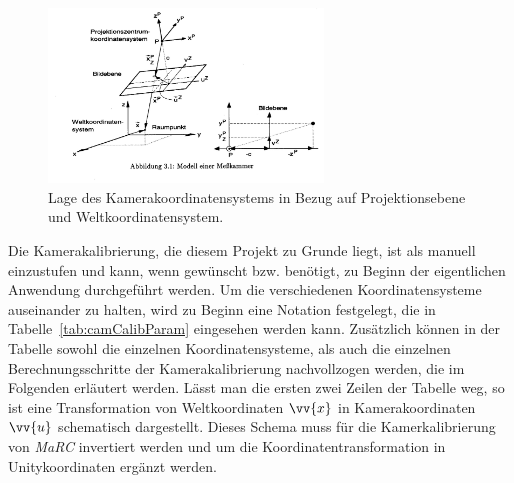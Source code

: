 \begin{figure}[H]
		\centering
		\includegraphics[width=0.65\textwidth , trim = 0mm 65mm 270mm 0mm, clip]{Bilder/cameraCalib.jpg}
			\caption{Lage des Kamerakoordinatensystems in Bezug auf Projektionsebene und Weltkoordinatensystem. \cite{Meisel:77890}}
			\label{fig:cameraCalib}
	\end{figure}

Die Kamerakalibrierung, die diesem Projekt zu Grunde liegt, ist als manuell einzustufen und kann, wenn gewünscht bzw. benötigt, zu Beginn der eigentlichen Anwendung durchgeführt werden. Um die verschiedenen Koordinatensysteme auseinander zu halten, wird zu Beginn eine Notation festgelegt, die in Tabelle~\ref{tab:camCalibParam} eingesehen werden kann. Zusätzlich können in der Tabelle sowohl die einzelnen Koordinatensysteme, als auch die einzelnen Berechnungsschritte der Kamerakalibrierung nachvollzogen werden, die im Folgenden erläutert werden. Lässt man die ersten zwei Zeilen der Tabelle weg, so ist eine Transformation von Weltkoordinaten $\vv{x}$ in Kamerakoordinaten $\vv{u}$ schematisch dargestellt. Dieses Schema muss für die Kamerkalibrierung von \textit{MaRC} invertiert werden und um die Koordinatentransformation in Unitykoordinaten ergänzt werden.  \\

